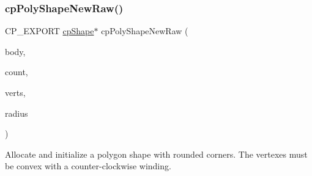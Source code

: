 \subsubsection{\texorpdfstring{cp\+Poly\+Shape\+New\+Raw()}{cpPolyShapeNewRaw()}}
{\footnotesize\ttfamily C\+P\+\_\+\+E\+X\+P\+O\+RT \mbox{\hyperlink{structcp_shape}{cp\+Shape}}$\ast$ cp\+Poly\+Shape\+New\+Raw (\begin{DoxyParamCaption}\item[{\mbox{\hyperlink{structcp_body}{cp\+Body}} $\ast$}]{body,  }\item[{int}]{count,  }\item[{const \mbox{\hyperlink{structcp_vect}{cp\+Vect}} $\ast$}]{verts,  }\item[{\mbox{\hyperlink{group__basic_types_gac1ed65573e035bf892505768c852d8d3}{cp\+Float}}}]{radius }\end{DoxyParamCaption})}

Allocate and initialize a polygon shape with rounded corners. The vertexes must be convex with a counter-\/clockwise winding. 